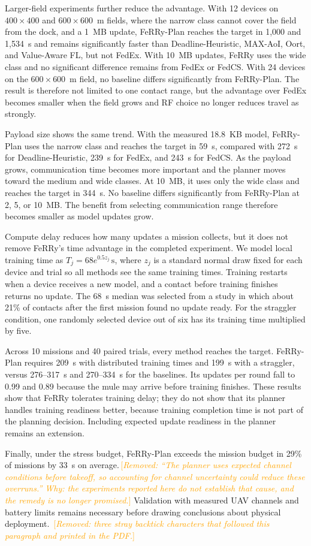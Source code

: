 \documentclass[conference]{IEEEtran}
\newcommand{\sysname}{FeRRy}
\newcommand{\changenote}[1]{\textcolor{orange}{\,[\emph{#1}]}}
\begin{document}
Larger-field experiments further reduce the advantage. With 12 devices on
\(400\times400\) and \(600\times600\)~m fields, where the narrow class cannot
cover the field from the dock, and a 1~MB update, \sysname{}-Plan reaches the
target in 1,000 and 1,534~s and remains significantly faster than
Deadline-Heuristic, MAX-AoI, Oort, and Value-Aware FL, but not FedEx. With
10~MB updates, \sysname{} uses the wide class and no significant difference
remains from FedEx or FedCS. With 24 devices on the
\(600\times600\)~m field, no baseline differs significantly from
\sysname{}-Plan. The result is therefore not limited to one contact range, but
the advantage over FedEx becomes smaller when the field grows and RF choice no
longer reduces travel as strongly.

Payload size shows the same trend. With the measured 18.8~KB model,
\sysname{}-Plan uses the narrow class and reaches the target in 59~s, compared
with 272~s for Deadline-Heuristic, 239~s for FedEx, and 243~s for FedCS.
As the payload grows, communication time becomes more important and the planner
moves toward the medium and wide classes. At 10~MB, it uses only the wide class
and reaches the target in 344~s. No baseline differs significantly from
\sysname{}-Plan at 2, 5, or 10~MB. The benefit from selecting communication
range therefore becomes smaller as model updates grow.

Compute delay reduces how many updates a mission collects, but it does not
remove \sysname{}'s time advantage in the completed experiment. We model local
training time as
\(T_j=68e^{0.5z_j}\,\mathrm{s}\), where \(z_j\) is a standard normal draw
fixed for each device and trial so all methods see the same training times.
Training restarts when a device receives a new model, and a contact before
training finishes returns no update. The 68~s median was selected from a study
in which about 21\% of contacts after the first mission found no update ready.
For the straggler condition, one randomly selected device out of six has its
training time multiplied by five.

Across 10 missions and 40 paired trials, every method reaches the target.
\sysname{}-Plan requires 209~s with distributed training times and 199~s with
a straggler, versus 276--317~s and 270--334~s for the baselines. Its updates
per round fall to 0.99 and 0.89 because the mule may arrive before training
finishes. These results show that \sysname{} tolerates training delay; they do
not show that its planner handles training readiness better, because training
completion time is not part of the planning decision. Including expected update
readiness in the planner remains an extension.

Finally, under the stress budget, \sysname{}-Plan exceeds the mission budget in
29\% of missions by 33~s on average.\changenote{Removed: ``The planner uses expected channel conditions before takeoff, so accounting for channel uncertainty could reduce these overruns.'' Why: the experiments reported here do not establish that cause, and the remedy is no longer promised.} Validation with measured UAV channels and battery limits remains
necessary before drawing conclusions about physical deployment.
\changenote{Removed: three stray backtick characters that followed this paragraph and printed in the PDF.}
\end{document}
